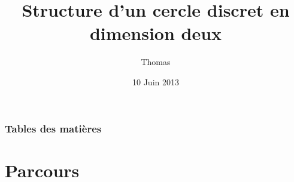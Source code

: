\documentclass{beamer}
\title[Présentation M2Disco]{Structure d'un cercle discret en dimension deux} %
\author{\bsc{Lafond} Thomas} %
\institute[LIRIS] %
{
Laboratoire d'InfoRmatique en Image et Syst\`{e}mes d'information \\ %
\medskip
\textit{-- Présentation d'équipe : M2Disco --}\\
\medskip
Encadrant : \bsc{Roussillon} Tristan 
}
\date{10 Juin 2013} %
\begin{document}
\begin{frame}
\titlepage %
\end{frame}

\begin{frame}
\frametitle{Tables des matières} %
\setcounter{tocdepth}{1}
\tableofcontents %
\end{frame}


\section{Parcours} 
\end{document}
